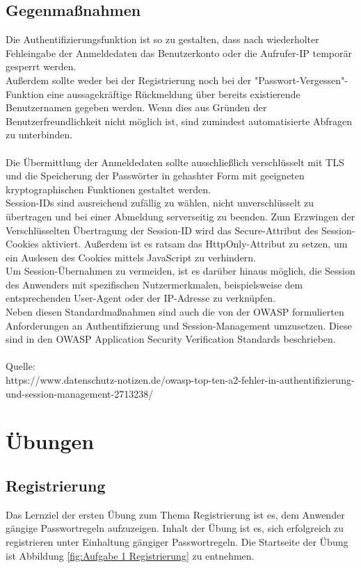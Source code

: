 \subsection{Gegenmaßnahmen}
Die Authentifizierungsfunktion ist so zu gestalten, dass nach wiederholter Fehleingabe der Anmeldedaten das Benutzerkonto oder die Aufrufer-IP temporär gesperrt werden.\\
Außerdem sollte weder bei der Registrierung noch bei der "Passwort-Vergessen"-Funktion eine aussagekräftige Rückmeldung über bereits existierende Benutzernamen gegeben werden. Wenn dies aus Gründen der Benutzerfreundlichkeit nicht möglich ist, sind zumindest automatisierte Abfragen zu unterbinden.\\\\
Die Übermittlung der Anmeldedaten sollte ausschließlich verschlüsselt mit TLS und die Speicherung der Passwörter in gehashter Form mit geeigneten kryptographischen Funktionen gestaltet werden.\\
Session-IDs sind ausreichend zufällig zu wählen, nicht unverschlüsselt zu übertragen und bei einer Abmeldung serverseitig zu beenden. Zum Erzwingen der Verschlüsselten Übertragung der Session-ID wird das Secure-Attribut des Session-Cookies aktiviert. Außerdem ist es ratsam das HttpOnly-Attribut zu setzen, um ein Auslesen des Cookies mittels JavaScript zu verhindern.\\
Um Session-Übernahmen zu vermeiden, ist es darüber hinaus möglich, die Session des Anwenders mit spezifischen Nutzermerkmalen, beispielsweise dem entsprechenden User-Agent oder der IP-Adresse zu verknüpfen.\\
Neben diesen Standardmaßnahmen sind auch die von der OWASP formulierten Anforderungen an Authentifizierung und Session-Management umzusetzen. Diese sind in den OWASP Application Security Verification Standards beschrieben.\\
\\
Quelle:\\ https://www.datenschutz-notizen.de/owasp-top-ten-a2-fehler-in-authentifizierung-und-session-management-2713238/

\section{Übungen}
\subsection{Registrierung}
Das Lernziel der ersten Übung zum Thema Registrierung ist es, dem Anwender gängige Passwortregeln aufzuzeigen. Inhalt der Übung ist es, sich erfolgreich zu registrieren unter Einhaltung gängiger Passwortregeln. Die Startseite der Übung ist Abbildung \ref{fig:Aufgabe 1 Registrierung} zu entnehmen.\\


